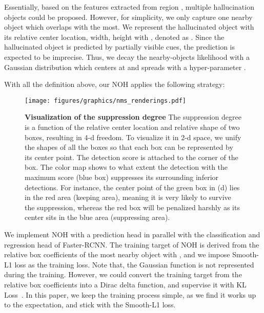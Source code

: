 \documentclass[sigconf]{acmart}
\begin{document}
Essentially, based on the features extracted from region , multiple hallucination objects could be proposed. However, for simplicity, we only capture one nearby object which overlaps with  the most. We represent the hallucinated object with its relative center location, width, height with , denoted as . Since the hallucinated object is predicted by partially visible cues, the prediction is expected to be imprecise. Thus, we decay the nearby-objects likelihood with a Gaussian distribution which centers at  and spreads with a hyper-parameter .

With all the definition above, our NOH applies the following strategy:




 \begin{figure}[t]
\begin{center}
\texttt{[image: figures/graphics/nms\_renderings.pdf]}
\end{center}
\caption{\textbf{Visualization of the suppression degree} {\normalfont The suppression degree is a function of the relative center location and relative shape of two boxes, resulting in 4-d freedom. To visualize it in 2-d space, we unify the shapes of all the boxes so that each box can be represented by its center point. The detection score is attached to the corner of the box. The color map shows to what extent the detection with the maximum score (blue box) suppresses its surrounding inferior detections. For instance, the center point of the green box in (d) lies in the red area (keeping area), meaning it is very likely to survive the suppression, whereas the red box will be penalized harshly as its center sits in the blue area (suppressing area).}}
\vspace{-0.3cm}
\label{fig:nms}
\end{figure}

 
We implement NOH with a prediction head in parallel with the classification and regression head of Faster-RCNN. The training target of NOH is derived from the relative box coefficients of the most nearby object with , and we impose Smooth-L1 loss as the training loss. Note that, the Gaussian function is not represented during the training. However, we could convert the training target from the relative box coefficients into a Dirac delta function, and supervise it with KL Loss~\cite{kl-loss}. In this paper, we keep the training process simple, as we find it works up to the expectation, and stick with the Smooth-L1 loss.
\end{document}
